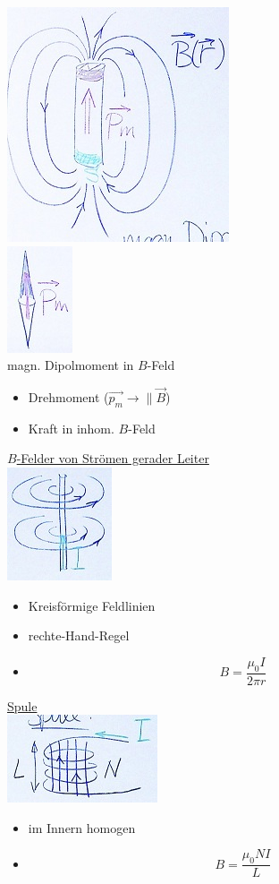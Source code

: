 \begin{rep*}[ note = Magnetfelder ]
	\includegraphics{Bild200} \\
	\includegraphics{Bild201} \\
	magn. Dipolmoment in $B$-Feld
	\begin{itemize}[ label = $\rightarrow$ ]
		\item Drehmoment ($\vec{p_m} \rightarrow \parallel \vec{B}$)
		\item Kraft in inhom. $B$-Feld
	\end{itemize}
	
	\uline{$B$-Felder von Strömen gerader Leiter} \\
	\includegraphics{Bild202} \\
	\begin{itemize}
		\item Kreisförmige Feldlinien
		\item rechte-Hand-Regel
		\item \[ \boxed{ B = \frac{\mu_0 I}{2 \pi r} } \]
	\end{itemize}
	
	\uline{Spule} \\
	\includegraphics{Bild203} \\
	\begin{itemize}
		\item im Innern homogen
		\item \[ \boxed{ B = \frac{\mu_0 N I}{L} } \]
	\end{itemize}
	

\end{rep*}
